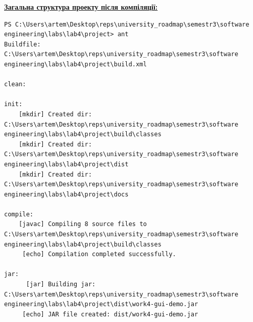 \documentclass[12pt,a4paper]{article}
\begin{document}
    \textbf{\underline{Загальна структура проекту після компіляції:}}
    
    \begin{verbatim}
PS C:\Users\artem\Desktop\reps\university_roadmap\semestr3\software engineering\labs\lab4\project> ant 
Buildfile: C:\Users\artem\Desktop\reps\university_roadmap\semestr3\software engineering\labs\lab4\project\build.xml

clean:

init:
    [mkdir] Created dir: C:\Users\artem\Desktop\reps\university_roadmap\semestr3\software engineering\labs\lab4\project\build\classes
    [mkdir] Created dir: C:\Users\artem\Desktop\reps\university_roadmap\semestr3\software engineering\labs\lab4\project\dist
    [mkdir] Created dir: C:\Users\artem\Desktop\reps\university_roadmap\semestr3\software engineering\labs\lab4\project\docs

compile:
    [javac] Compiling 8 source files to C:\Users\artem\Desktop\reps\university_roadmap\semestr3\software engineering\labs\lab4\project\build\classes
     [echo] Compilation completed successfully.

jar:
      [jar] Building jar: C:\Users\artem\Desktop\reps\university_roadmap\semestr3\software engineering\labs\lab4\project\dist\work4-gui-demo.jar
     [echo] JAR file created: dist/work4-gui-demo.jar


\end{verbatim}
\end{document}
